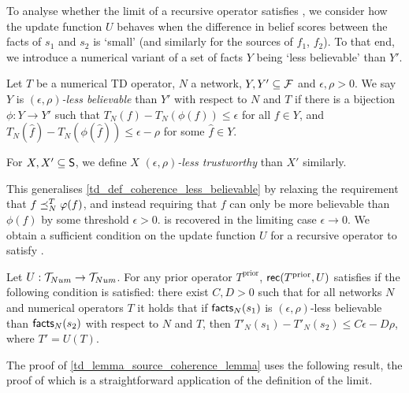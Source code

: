 To analyse whether the limit of a recursive operator satisfies \coherence{}, we
consider how the update function $U$ behaves when the difference in belief
scores between the facts of $s_1$ and $s_2$ is `small' (and similarly for the
sources of $f_1$, $f_2$). To that end, we introduce a numerical variant of a
set of facts $Y$ being `less believable' than $Y'$.

\begin{definition}
\label{td_def_num_less_believable}

Let $T$ be a numerical TD operator, $N$ a network, $Y, Y' \subseteq \F$ and
$\epsilon, \rho > 0$.  We say $Y$ is \emph{$(\epsilon, \rho)$-less believable}
than $Y'$ with respect to $N$ and $T$ if there is a bijection $\phi: Y \to Y'$
such that $T_N(f) - T_N(\phi(f)) \le \epsilon$ for all $f \in Y$, and
$T_N(\hat{f})
- T_N(\phi(\hat{f})) \le \epsilon - \rho$ for some $\hat{f} \in Y$.

For $X, X' \subseteq \S$, we define $X$ \emph{$(\epsilon, \rho)$-less
trustworthy} than $X'$ similarly.

\end{definition}

This generalises \cref{td_def_coherence_less_believable} by relaxing the
requirement that ${f \fle_N^T \phi(f)}$, and instead requiring that $f$ can
only be more believable than $\phi(f)$ by some threshold $\epsilon > 0$.
 is recovered in the limiting
case $\epsilon \to 0$. We obtain a sufficient condition on the update function
$U$ for a recursive operator to satisfy \sourcecoherence{}.

\begin{lemma}
\label{td_lemma_source_coherence_lemma}

Let $U: \num \to \num$. For any prior operator $T^{\text{prior}}$,
    $\rec(T^{\text{prior}}, U)$ satisfies \sourcecoherence{} if the following
condition is satisfied: there exist $C, D > 0$ such that for all networks $N$
and numerical operators $T$ it holds that if $\facts_N(s_1)$ is $(\epsilon,
\rho)$-less believable than $\facts_N(s_2)$ with respect to $N$ and $T$, then
    $T'_N(s_1) - T'_N(s_2) \le C\epsilon - D\rho$,
where $T' = U(T)$.

\end{lemma}

The proof of \cref{td_lemma_source_coherence_lemma} uses the following
result, the proof of which is a straightforward application of the definition
of the limit.

